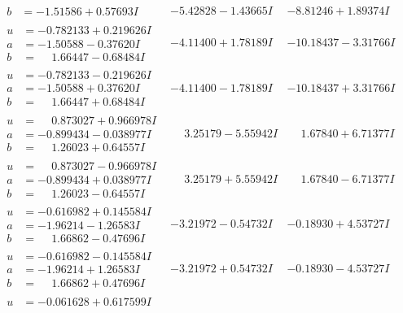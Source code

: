 \documentclass[1p]{elsarticle_modified}
\theoremstyle{definition}
\begin{document}
$$\begin{array}{c|c|c}
\begin{aligned}
b &= -1.51586 + 0.57693 I\end{aligned}
 & -5.42828 - 1.43665 I & -8.81246 + 1.89374 I \\ \hline\begin{aligned}
u &= -0.782133 + 0.219626 I \\
a &= -1.50588 - 0.37620 I \\
b &= \phantom{-}1.66447 - 0.68484 I\end{aligned}
 & -4.11400 + 1.78189 I & -10.18437 - 3.31766 I \\ \hline\begin{aligned}
u &= -0.782133 - 0.219626 I \\
a &= -1.50588 + 0.37620 I \\
b &= \phantom{-}1.66447 + 0.68484 I\end{aligned}
 & -4.11400 - 1.78189 I & -10.18437 + 3.31766 I \\ \hline\begin{aligned}
u &= \phantom{-}0.873027 + 0.966978 I \\
a &= -0.899434 - 0.038977 I \\
b &= \phantom{-}1.26023 + 0.64557 I\end{aligned}
 & \phantom{-}3.25179 - 5.55942 I & \phantom{-}1.67840 + 6.71377 I \\ \hline\begin{aligned}
u &= \phantom{-}0.873027 - 0.966978 I \\
a &= -0.899434 + 0.038977 I \\
b &= \phantom{-}1.26023 - 0.64557 I\end{aligned}
 & \phantom{-}3.25179 + 5.55942 I & \phantom{-}1.67840 - 6.71377 I \\ \hline\begin{aligned}
u &= -0.616982 + 0.145584 I \\
a &= -1.96214 - 1.26583 I \\
b &= \phantom{-}1.66862 - 0.47696 I\end{aligned}
 & -3.21972 - 0.54732 I & -0.18930 + 4.53727 I \\ \hline\begin{aligned}
u &= -0.616982 - 0.145584 I \\
a &= -1.96214 + 1.26583 I \\
b &= \phantom{-}1.66862 + 0.47696 I\end{aligned}
 & -3.21972 + 0.54732 I & -0.18930 - 4.53727 I \\ \hline\begin{aligned}
u &= -0.061628 + 0.617599 I \\

\end{aligned}
\end{array}$$
\end{document}

